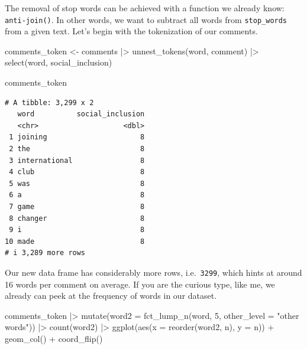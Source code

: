 \documentclass[
  letterpaper,
  DIV=11,
  numbers=noendperiod]{scrreprt}
\newenvironment{Shaded}{\begin{snugshade}}{\end{snugshade}}
\newcommand{\AttributeTok}[1]{\textcolor[rgb]{0.40,0.45,0.13}{#1}}
\newcommand{\DecValTok}[1]{\textcolor[rgb]{0.68,0.00,0.00}{#1}}
\newcommand{\FunctionTok}[1]{\textcolor[rgb]{0.28,0.35,0.67}{#1}}
\newcommand{\NormalTok}[1]{\textcolor[rgb]{0.00,0.23,0.31}{#1}}
\newcommand{\OtherTok}[1]{\textcolor[rgb]{0.00,0.23,0.31}{#1}}
\newcommand{\SpecialCharTok}[1]{\textcolor[rgb]{0.37,0.37,0.37}{#1}}
\newcommand{\StringTok}[1]{\textcolor[rgb]{0.13,0.47,0.30}{#1}}
\begin{document}
The removal of stop words can be achieved with a function we already
know: \texttt{anti-join()}. In other words, we want to subtract all
words from \texttt{stop\_words} from a given text. Let's begin with the
tokenization of our comments.

\begin{Shaded}
\begin{Highlighting}[]
\NormalTok{comments\_token }\OtherTok{\textless{}{-}}
\NormalTok{  comments }\SpecialCharTok{|\textgreater{}}
  \FunctionTok{unnest\_tokens}\NormalTok{(word, comment) }\SpecialCharTok{|\textgreater{}}
  \FunctionTok{select}\NormalTok{(word, social\_inclusion)}

\NormalTok{comments\_token}
\end{Highlighting}
\end{Shaded}

\begin{verbatim}
# A tibble: 3,299 x 2
   word          social_inclusion
   <chr>                    <dbl>
 1 joining                      8
 2 the                          8
 3 international                8
 4 club                         8
 5 was                          8
 6 a                            8
 7 game                         8
 8 changer                      8
 9 i                            8
10 made                         8
# i 3,289 more rows
\end{verbatim}

Our new data frame has considerably more rows, i.e.~\texttt{3299}, which
hints at around 16 words per comment on average. If you are the curious
type, like me, we already can peek at the frequency of words in our
dataset.

\begin{Shaded}
\begin{Highlighting}[]
\NormalTok{comments\_token }\SpecialCharTok{|\textgreater{}}
  \FunctionTok{mutate}\NormalTok{(}\AttributeTok{word2 =} \FunctionTok{fct\_lump\_n}\NormalTok{(word, }\DecValTok{5}\NormalTok{,}
                            \AttributeTok{other\_level =} \StringTok{"other words"}\NormalTok{)) }\SpecialCharTok{|\textgreater{}}
  \FunctionTok{count}\NormalTok{(word2) }\SpecialCharTok{|\textgreater{}}
  \FunctionTok{ggplot}\NormalTok{(}\FunctionTok{aes}\NormalTok{(}\AttributeTok{x =} \FunctionTok{reorder}\NormalTok{(word2, n),}
             \AttributeTok{y =}\NormalTok{ n)) }\SpecialCharTok{+}
  \FunctionTok{geom\_col}\NormalTok{() }\SpecialCharTok{+}
  \FunctionTok{coord\_flip}\NormalTok{()}
\end{Highlighting}
\end{Shaded}
\end{document}
